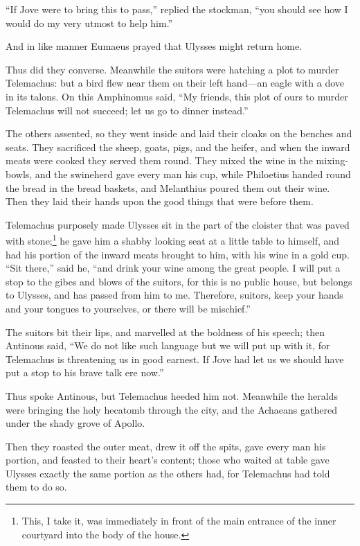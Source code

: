 “If Jove were to bring this to pass,” replied the stockman, “you should see how
I would do my very utmost to help him.”

And in like manner Eumaeus prayed that Ulysses might return home.

Thus did they converse. Meanwhile the suitors were hatching a plot to murder
Telemachus: but a bird flew near them on their left hand—an eagle with a dove
in its talons. On this Amphinomus said, “My friends, this plot of ours to
murder Telemachus will not succeed; let us go to dinner instead.”

The others assented, so they went inside and laid their cloaks on the benches
and seats. They sacrificed the sheep, goats, pigs, and the heifer, and when the
inward meats were cooked they served them round. They mixed the wine in the
mixing-bowls, and the swineherd gave every man his cup, while Philoetius handed
round the bread in the bread baskets, and Melanthius poured them out their
wine. Then they laid their hands upon the good things that were before them.

Telemachus purposely made Ulysses sit in the part of the cloister that was
paved with stone;\footnote{This, I take it, was immediately in front of the main entrance of the inner
courtyard into the body of the house.} he gave him a shabby looking seat
at a little table to himself, and had his portion of the inward meats brought
to him, with his wine in a gold cup. “Sit there,” said he, “and drink your wine
among the great people. I will put a stop to the gibes and blows of the
suitors, for this is no public house, but belongs to Ulysses, and has passed
from him to me. Therefore, suitors, keep your hands and your tongues to
yourselves, or there will be mischief.”

The suitors bit their lips, and marvelled at the boldness of his speech; then
Antinous said, “We do not like such language but we will put up with it, for
Telemachus is threatening us in good earnest. If Jove had let us we should have
put a stop to his brave talk ere now.”

Thus spoke Antinous, but Telemachus heeded him not. Meanwhile the heralds were
bringing the holy hecatomb through the city, and the Achaeans gathered under
the shady grove of Apollo.

Then they roasted the outer meat, drew it off the spits, gave every man his
portion, and feasted to their heart’s content; those who waited at table gave
Ulysses exactly the same portion as the others had, for Telemachus had told
them to do so.


